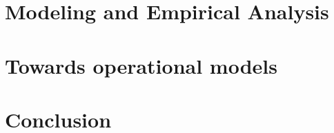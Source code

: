 \part{Modeling and Empirical Analysis} %



















\cleardoublepage %





\part{Towards operational models} %









\ctparttext{}


\part*{Conclusion}





% 

\cleardoublepage %

